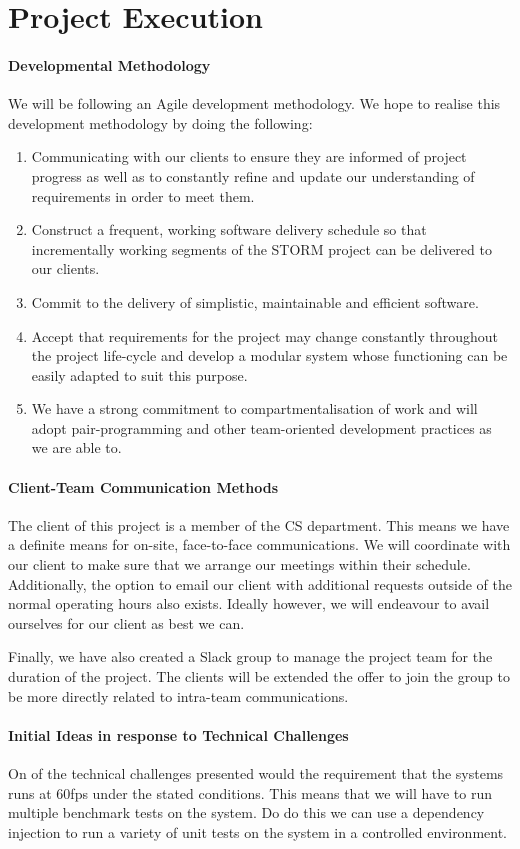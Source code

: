 \documentclass[12pt]{article}
\begin{document}
\section{Project Execution}
\paragraph{Developmental Methodology}
We will be following an Agile development methodology. We hope to realise this development methodology by doing the following:
\begin{enumerate}
\item Communicating with our clients to ensure they are informed of project progress as well as to constantly refine and update our understanding of requirements in order to meet them.
\item Construct a frequent, working software delivery schedule so that incrementally working segments of the STORM project can be delivered to our clients.
\item Commit to the delivery of simplistic, maintainable and efficient software.
\item Accept that requirements for the project may change constantly throughout the project life-cycle and develop a modular system whose functioning can be easily adapted to suit this purpose.
\item We have a strong commitment to compartmentalisation of work and will adopt pair-programming and other team-oriented development practices as we are able to.

\end{enumerate}

\paragraph{Client-Team Communication Methods}
The client of this project is a member of the CS department. This means we have a definite means for on-site, face-to-face communications. We will coordinate with our client to make sure that we arrange our meetings within their schedule. Additionally, the option to email our client with additional requests outside of the normal operating hours also exists. Ideally however, we will endeavour to avail ourselves for our client as best we can.

Finally, we have also created a Slack group to manage the project team for the duration of the project. The clients will be extended the offer to join the group to be more directly related to intra-team communications.
\paragraph{Initial Ideas in response to Technical Challenges}
On of the technical challenges presented would the requirement that the systems runs at 60fps under the stated conditions. This means that we will have to run multiple benchmark tests on the system. Do do this we can use a dependency injection to run a variety of unit tests on the system in a controlled environment.
\end{document}
